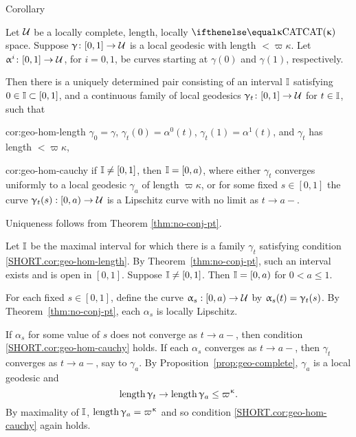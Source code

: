 \begin{thm}{Corollary}\label{cor:geo-hom}{\sloppy 
Let $\mathcal{U}$ be a locally complete, length, locally $\CAT\kappa$ space.
Suppose $\gamma\:[0,1]\to\spc{U}$ is a local geodesic with length $< \varpi\kappa$.  Let $\alpha^i\:[0,1]\to \spc{U}$, for $i=0,1$, be curves starting at $\gamma(0)$ and $\gamma(1)$, respectively.  

}

Then there is a uniquely determined pair consisting of an interval $\mathbb{I} $ satisfying $0\in \II\subset[0,1]$, and a continuous family of local geodesics $\gamma_t\:[0,1]\to \spc{U}$ for  $t\in \II$, such that  

\begin{subthm}{cor:geo-hom-length}
$\gamma_0=\gamma$, $\gamma_t(0)=\alpha^0(t)$, $\gamma_t(1)=\alpha^1(t)$, and $\gamma_t$ has length $< \varpi\kappa$,
\end{subthm} 

\begin{subthm}{cor:geo-hom-cauchy}
if $\mathbb{I}\ne [0,1]$, then $\mathbb{I}=[0, a)$, where either $\gamma_t$ converges uniformly to a local geodesic $\gamma_a$ of length $\varpi\kappa$, or 
for some fixed $s\in [0,1]$ the curve $\gamma_t(s):[0,a)\to\spc{U}$ is a Lipschitz curve with no limit 
as $t\to a-$.
\end{subthm}

\end{thm}


 Uniqueness follows from  Theorem \ref{thm:no-conj-pt}.

Let $\mathbb{I}$ be the maximal interval for which there is a family $\gamma_t$ satisfying condition \ref{SHORT.cor:geo-hom-length}. 
By Theorem~\ref{thm:no-conj-pt}, such an interval exists and is open in $[0,1]$.  Suppose $\mathbb{I}\ne[0,1]$.
Then  $\mathbb{I}=[0,a)$ for $0<a\le 1$.

For each fixed $s\in [0,1]$, define the curve $\alpha_s:[0,a)\to\spc{U}$ by $\alpha_s(t)\z=\gamma_t(s)$. 
By Theorem~\ref{thm:no-conj-pt}, 
each $\alpha_s$ is locally Lipschitz.  

If $\alpha_s$ for some value of $s$ does not converge as $t\to a-$, then condition \ref{SHORT.cor:geo-hom-cauchy} holds.
If each $\alpha_s$  converges as $t\to a-$, then $ \gamma_t$ converges as $t\to a-$, say to $\gamma_a$.
By  Proposition~\ref{prop:geo-complete}, $\gamma_a$ is a local geodesic and\[\length\gamma_t\to\length\gamma_a\le \varpi\kappa.\]
By maximality of $\mathbb{I}$, $\length\gamma_a=\varpi\kappa$ and so condition \ref{SHORT.cor:geo-hom-cauchy} again holds.
\qeds

